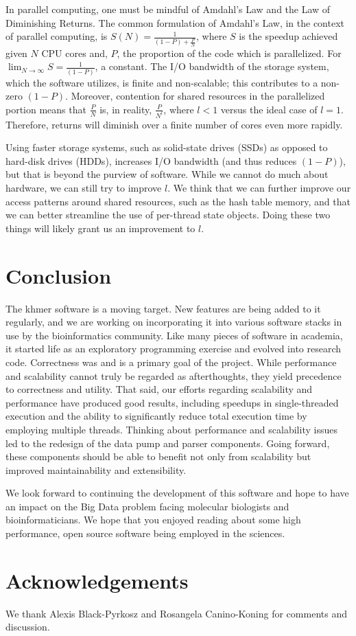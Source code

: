 \documentclass{article}
\begin{document}
In parallel computing, one must be mindful of Amdahl's Law \citep{web:Amdahl}
and the Law of Diminishing Returns. The common formulation of Amdahl's Law, in
the context of parallel computing, is $S(N) = \frac{1}{(1 - P) + \frac{P}{N}}$,
where $S$ is the speedup achieved given $N$ CPU cores and, $P$, the proportion
of the code which is parallelized.  For $\lim_{N\to\infty} S = \frac{1}{(1 -
P)}$, a constant.  The I/O bandwidth of the storage system, which the software
utilizes, is finite and non-scalable; this contributes to a non-zero $(1 - P)$.
Moreover, contention for shared resources in the parallelized portion means
that $\frac{P}{N}$ is, in reality, $\frac{P}{N^l}$, where $l < 1$ versus the
ideal case of $l = 1$.  Therefore, returns will diminish over a finite number
of cores even more rapidly.

Using faster storage systems, such as solid-state drives (SSDs) as opposed to
hard-disk drives (HDDs), increases I/O bandwidth (and thus reduces $(1 - P)$),
but that is beyond the purview of software. While we cannot do much about
hardware, we can still try to improve $l$. We think that we can further improve
our access patterns around shared resources, such as the hash table memory, and
that we can better streamline the use of per-thread state objects. Doing these
two things will likely grant us an improvement to $l$.

\section{Conclusion}

The khmer software is a moving target. New features are being added to it
regularly, and we are working on incorporating it into various software stacks
in use by the bioinformatics community. Like many pieces of software in
academia, it started life as an exploratory programming exercise and evolved
into research code.  Correctness was and is a primary goal of the project.
While performance and scalability cannot truly be regarded as afterthoughts,
they yield precedence to correctness and utility. That said, our efforts
regarding scalability and performance have produced good results, including
speedups in single-threaded execution and the ability to significantly reduce
total execution time by employing multiple threads. Thinking about performance
and scalability issues led to the redesign of the data pump and parser
components. Going forward, these components should be able to benefit not only
from scalability but improved maintainability and extensibility.

We look forward to continuing the development of this software and hope to have
an impact on the Big Data problem facing molecular biologists and
bioinformaticians. We hope that you enjoyed reading about some high
performance, open source software being employed in the sciences.

\section{Acknowledgements}

We thank Alexis Black-Pyrkosz and Rosangela Canino-Koning for comments and
discussion.



\end{document}
